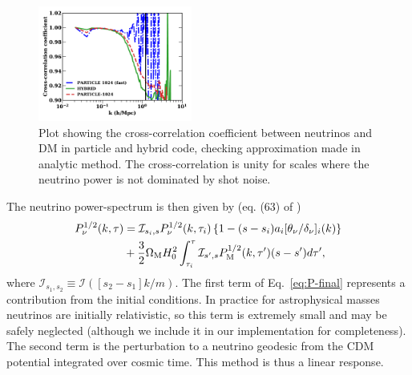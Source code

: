 \documentclass[useAMS, usenatbib]{mnras}
\begin{document}
\begin{figure}
\includegraphics[width=0.45\textwidth]{nuplots/corr_coeff-1.pdf}
  \caption{Plot showing the cross-correlation coefficient between neutrinos
  and DM in particle and hybrid code, checking approximation made in analytic method.
  The cross-correlation is unity for scales where the neutrino power is not dominated by shot noise.
  }
  \label{fig:cross-corr}
\end{figure}

The neutrino power-spectrum is then given by (eq. (63) of \cite{AHB})
\begin{align}
P_{\nu}^{1/2}(k, \tau) &= \mathcal{I}_{s_i, s}
P_{\nu}^{1/2}(k, \tau_i) \left\{1 - (s - s_i)  a_i [\theta_{\nu}/\delta_{\nu}]_{i}(k)\right\}\nonumber\\
&+ \frac32 \Omega_{\rm M} H_0^2 \int_{\tau_i}^{\tau} \mathcal{I}_{s', s}
P^{1/2}_{\rm M}(k, \tau') (s - s')d \tau', \label{eq:P-final}
\end{align}
where $\mathcal{I}_{s_1, s_2} \equiv \mathcal{I}([s_2 -s_1]k/m)$.
The first term of Eq.~\ref{eq:P-final} represents a contribution from the initial conditions. In practice
for astrophysical masses neutrinos are initially relativistic, so this term is extremely small and may
be safely neglected (although we include it in our implementation for completeness).
The second term is the perturbation to a neutrino geodesic from the CDM potential
integrated over cosmic time. This method is thus a linear response.
\end{document}
